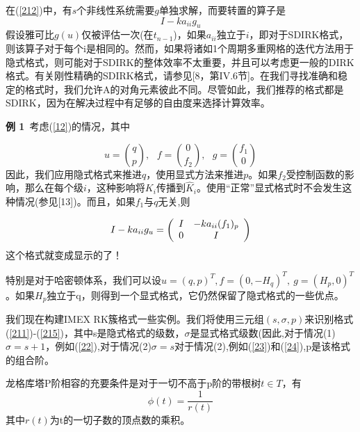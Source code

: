 \documentclass[12pt,a4paper]{article}
\numberwithin{equation}{section}
\begin{document}
在(\ref{212})中，有$s$个非线性系统需要$g$单独求解，而要转置的算子是
\begin{equation}
I-ka_{ii}g_{u}
\end{equation}
假设雅可比$g(u)$仅被评估一次(在$t_{n-1}$)，如果$a_{ii}$独立于$i$，即对于SDIRK格式，则该算子对于每个i是相同的。然而，如果将诸如1个周期多重网格的迭代方法用于隐式格式，则可能对于SDIRK的整体效率不太重要，并且可以考虑更一般的DIRK格式。有关刚性精确的SDIRK格式，请参见[8，第IV.6节]。在我们寻找准确和稳定的格式时，我们允许A的对角元素彼此不同。尽管如此，我们推荐的格式都是SDIRK，因为在解决过程中有足够的自由度来选择计算效率。

\textbf{例 1}~考虑(\ref{12})的情况，其中

\begin{equation}
u=\binom{q}{p},~~~f=\binom{0}{f_{2}},~~~g=\binom{f_{1}}{0}
\end{equation}
因此，我们应用隐式格式来推进$q$，使用显式方法来推进$p$。如果$f_{2}$受控制函数的影响，那么在每个级$i$，这种影响将$K_{i}$传播到$\widehat{K}_{i}$。使用“正常”显式格式时不会发生这种情况(参见[13])。而且，如果$f_{1}$与$q$无关,则

\begin{equation}
I-ka_{ii}g_{u}=\left(
\begin{array}{c c}
I & -ka_{ii}(f_{1})_{p}\\
0 & I\\
\end{array}
\right)
\end{equation}
这个格式就变成显示的了！

特别是对于哈密顿体系，我们可以设$u=(q,p)^T,f=(0,-H_{q})^T,~g=(H_{p},0)^T$。如果$H_{p}$独立于q，则得到一个显式格式，它仍然保留了隐式格式的一些优点。


我们现在构建IMEX RK簇格式一些实例。我们将使用三元组$(s,\sigma,p)$来识别格式(\ref{211})-(\ref{215})，其中s是隐式格式的级数，$\sigma$是显式格式级数(因此,对于情况(1)$\sigma=s+1$，例如(\ref{22}),对于情况(2)$\sigma=s$对于情况(2),例如(\ref{23})和(\ref{24}),p是该格式的组合阶。


龙格库塔P阶相容的充要条件是对于一切不高于p阶的带根树$t\in T$，有
\begin{equation*}
\phi(t)=\frac{1}{r(t)}
\end{equation*}
其中$r(t)$为t的一切子数的顶点数的乘积。
\end{document}
